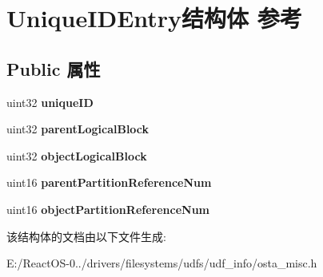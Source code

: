 \hypertarget{struct_unique_i_d_entry}{}\section{Unique\+I\+D\+Entry结构体 参考}
\label{struct_unique_i_d_entry}
\subsection*{Public 属性}
\begin{DoxyCompactItemize}
\item 
\mbox{\label{struct_unique_i_d_entry_a4c78c885410fdbc02995255e63c91170}} 
uint32 {\bfseries unique\+ID}
\item 
\mbox{\label{struct_unique_i_d_entry_a0819dca334ae98c4c8a13cee2b0f8f20}} 
uint32 {\bfseries parent\+Logical\+Block}
\item 
\mbox{\label{struct_unique_i_d_entry_aa2bb60586a486990cd90464da646dd75}} 
uint32 {\bfseries object\+Logical\+Block}
\item 
\mbox{\label{struct_unique_i_d_entry_a0ae3a19e20939afa2160ecfc8891c000}} 
uint16 {\bfseries parent\+Partition\+Reference\+Num}
\item 
\mbox{\label{struct_unique_i_d_entry_a3ced301b65345034b8440a71a5010f26}} 
uint16 {\bfseries object\+Partition\+Reference\+Num}
\end{DoxyCompactItemize}


该结构体的文档由以下文件生成\+:\begin{DoxyCompactItemize}
\item 
E\+:/\+React\+O\+S-\/0../drivers/filesystems/udfs/udf\+\_\+info/osta\+\_\+misc.\+h\end{DoxyCompactItemize}
